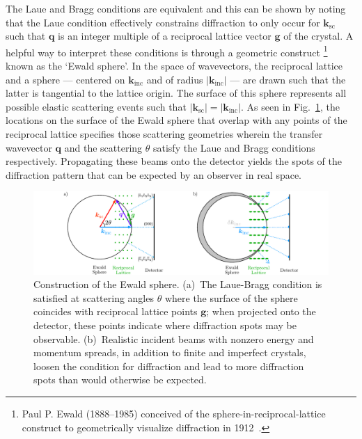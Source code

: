 The Laue and Bragg conditions are equivalent and this can be shown
by noting that the Laue condition effectively constrains
diffraction to only occur for $\boldsymbol{k}_\text{sc}$ such that
$\boldsymbol{q}$ is an integer multiple of a reciprocal lattice vector $\boldsymbol{g}$ of the crystal.
A helpful way to interpret these conditions is through
a geometric construct%
\footnote{Paul P. Ewald (1888--1985) conceived of the sphere-in-reciprocal-lattice construct
to geometrically visualize diffraction in 1912~\cite{EwaldBook}.} known as the `Ewald sphere'.
In the space of wavevectors, the reciprocal lattice
and a sphere --- centered on $\boldsymbol{k}_\textrm{inc}$ and
of radius $|\boldsymbol{k}_\textrm{inc}|$ ---
are drawn such that the latter is tangential to the lattice origin.
The surface of this sphere represents all possible elastic scattering events
such that $|\boldsymbol{k}_\textrm{sc}| = |\boldsymbol{k}_\textrm{inc}|$.
As seen in Fig.~\ref{fig: ewald}, the locations on the surface of the Ewald sphere that overlap
with any points of the reciprocal lattice specifies those scattering geometries
wherein the transfer wavevector $\boldsymbol{q}$ and the scattering $\theta$
satisfy the Laue and Bragg conditions respectively.
Propagating these beams onto the detector yields
the spots of the diffraction pattern that can be expected by an observer in real space.
%
\begin{figure}[t!]
  \centering
  \includegraphics[width = \textwidth]{Figures/fig_ch2_ewald.pdf}
  \caption[Construction of the Ewald sphere.]{
    Construction of the Ewald sphere.
    (a)~The Laue-Bragg condition is satisfied at scattering angles $\theta$
    where the surface of the sphere coincides with reciprocal lattice points $\boldsymbol{g}$;
    when projected onto the detector, these points indicate where diffraction spots may be observable.
    (b)~Realistic incident beams with nonzero energy and momentum spreads,
    in addition to finite and imperfect crystals,
    loosen the condition for diffraction and lead to more diffraction spots
    than would otherwise be expected.
  }
  \label{fig: ewald}
\end{figure}

